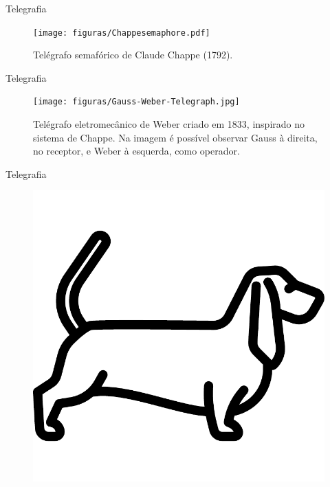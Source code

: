 \documentclass[aspectratio=169]{beamer}
\begin{document}
\begin{frame}{Telegrafia}
\begin{figure}
	\centering
	\texttt{[image: figuras/Chappesemaphore.pdf]}
	\caption{Telégrafo semafórico de Claude Chappe (1792).} 
	\label{fig:502} 
\end{figure}
\end{frame}

\begin{frame}{Telegrafia}
\begin{figure}
	\centering
	\texttt{[image: figuras/Gauss-Weber-Telegraph.jpg]}
	\caption{Tel{\'e}grafo eletromecânico de Weber criado em 1833, inspirado no sistema de Chappe. Na imagem é possível observar Gauss à direita, no receptor, e Weber à esquerda, como operador.}
	\label{fig:504}
\end{figure}
\end{frame}

\begin{frame}{Telegrafia}
\begin{figure}
	\includegraphics[scale=0.4]{figuras/basset2.pdf}
\end{figure}
\end{frame}
\end{document}
